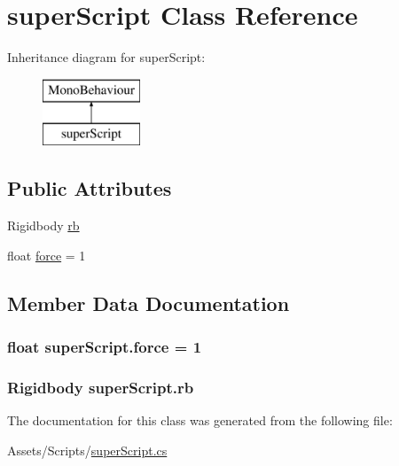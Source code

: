 \hypertarget{classsuper_script}{}\section{super\+Script Class Reference}
\label{classsuper_script}
Inheritance diagram for super\+Script\+:\begin{figure}[H]
\begin{center}
\leavevmode
\includegraphics[height=2.000000cm]{classsuper_script}
\end{center}
\end{figure}
\subsection*{Public Attributes}
\begin{DoxyCompactItemize}
\item 
Rigidbody \hyperlink{classsuper_script_a353668fefcd123b158c1c9ee4b27315b}{rb}
\item 
float \hyperlink{classsuper_script_af93edf1af3c4d0ed6666298f8bf7998d}{force} = 1
\end{DoxyCompactItemize}


\subsection{Member Data Documentation}
\hypertarget{classsuper_script_af93edf1af3c4d0ed6666298f8bf7998d}{}
\subsubsection[{force}]{\setlength{\rightskip}{0pt plus 5cm}float super\+Script.\+force = 1}\label{classsuper_script_af93edf1af3c4d0ed6666298f8bf7998d}
\hypertarget{classsuper_script_a353668fefcd123b158c1c9ee4b27315b}{}
\subsubsection[{rb}]{\setlength{\rightskip}{0pt plus 5cm}Rigidbody super\+Script.\+rb}\label{classsuper_script_a353668fefcd123b158c1c9ee4b27315b}


The documentation for this class was generated from the following file\+:\begin{DoxyCompactItemize}
\item 
Assets/\+Scripts/\hyperlink{super_script_8cs}{super\+Script.\+cs}\end{DoxyCompactItemize}

